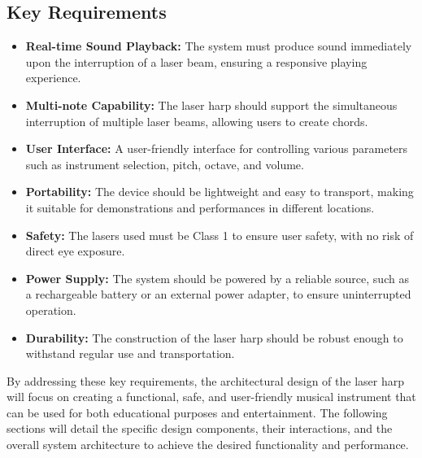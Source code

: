 \subsection{Key Requirements}

\begin{itemize}
    \item \textbf{Real-time Sound Playback:} The system must produce sound immediately upon the interruption of a laser beam, ensuring a responsive playing experience.
    \item \textbf{Multi-note Capability:} The laser harp should support the simultaneous interruption of multiple laser beams, allowing users to create chords.
    \item \textbf{User Interface:} A user-friendly interface for controlling various parameters such as instrument selection, pitch, octave, and volume.
    \item \textbf{Portability:} The device should be lightweight and easy to transport, making it suitable for demonstrations and performances in different locations.
    \item \textbf{Safety:} The lasers used must be Class 1 to ensure user safety, with no risk of direct eye exposure.
    \item \textbf{Power Supply:} The system should be powered by a reliable source, such as a rechargeable battery or an external power adapter, to ensure uninterrupted operation.
    \item \textbf{Durability:} The construction of the laser harp should be robust enough to withstand regular use and transportation.
\end{itemize}

By addressing these key requirements, the architectural design of the laser harp will focus on creating a functional, safe, and user-friendly musical instrument that can be used for both educational purposes and entertainment. The following sections will detail the specific design components, their interactions, and the overall system architecture to achieve the desired functionality and performance.
